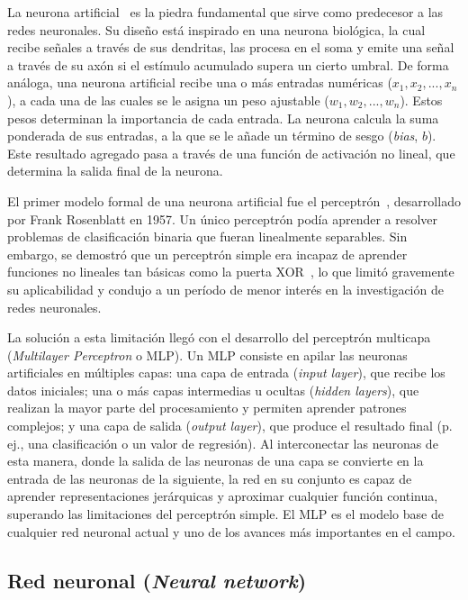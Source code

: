 La neurona artificial~\cite{mcculloch1943logical} es la piedra fundamental que sirve como predecesor a las redes neuronales. Su diseño está inspirado en una neurona biológica, la cual recibe señales a través de sus dendritas, las procesa en el soma y emite una señal a través de su axón si el estímulo acumulado supera un cierto umbral. De forma análoga, una neurona artificial recibe una o más entradas numéricas ($x_1, x_2, ..., x_n$), a cada una de las cuales se le asigna un peso ajustable ($w_1, w_2, ..., w_n$). Estos pesos determinan la importancia de cada entrada. La neurona calcula la suma ponderada de sus entradas, a la que se le añade un término de sesgo (\textit{bias}, $b$). Este resultado agregado pasa a través de una función de activación no lineal, que determina la salida final de la neurona.

El primer modelo formal de una neurona artificial fue el perceptrón~\cite{rosenblatt1958perceptron}, desarrollado por Frank Rosenblatt en 1957. Un único perceptrón podía aprender a resolver problemas de clasificación binaria que fueran linealmente separables. Sin embargo, se demostró que un perceptrón simple era incapaz de aprender funciones no lineales tan básicas como la puerta XOR~\cite{minsky2017perceptrons}, lo que limitó gravemente su aplicabilidad y condujo a un período de menor interés en la investigación de redes neuronales.

La solución a esta limitación llegó con el desarrollo del perceptrón multicapa (\textit{Multilayer Perceptron} o MLP). Un MLP consiste en apilar las neuronas artificiales en múltiples capas: una capa de entrada (\textit{input layer}), que recibe los datos iniciales; una o más capas intermedias u ocultas (\textit{hidden layers}), que realizan la mayor parte del procesamiento y permiten aprender patrones complejos; y una capa de salida (\textit{output layer}), que produce el resultado final (p. ej., una clasificación o un valor de regresión). Al interconectar las neuronas de esta manera, donde la salida de las neuronas de una capa se convierte en la entrada de las neuronas de la siguiente, la red en su conjunto es capaz de aprender representaciones jerárquicas y aproximar cualquier función continua, superando las limitaciones del perceptrón simple. El MLP es el modelo base de cualquier red neuronal actual y uno de los avances más importantes en el campo.

\subsection{Red neuronal (\textit{Neural network})}

